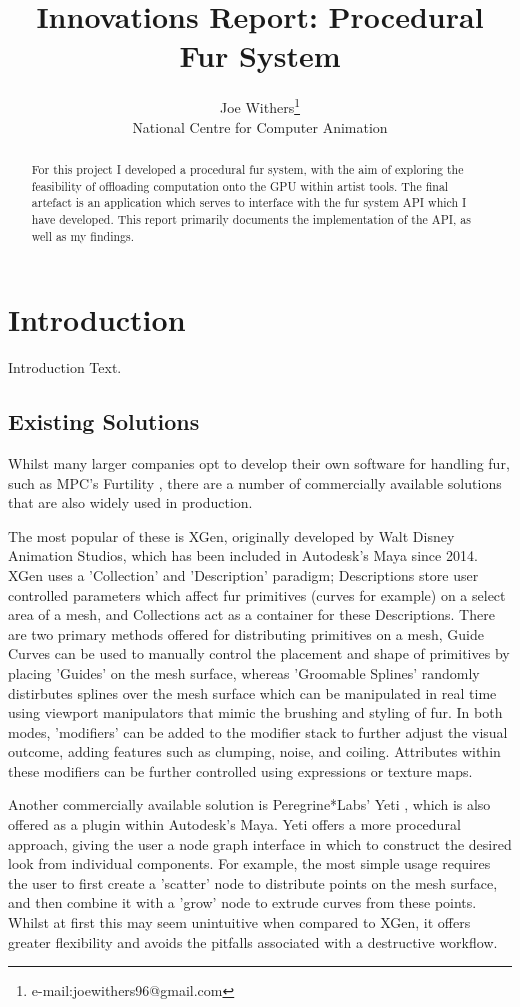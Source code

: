 \documentclass[]{acmsiggraph}
\title{Innovations Report: Procedural Fur System}
\author{Joe Withers\thanks{e-mail:joewithers96@gmail.com}\\National Centre for Computer Animation}
\begin{document}
\maketitle

\begin{abstract}
For this project I developed a procedural fur system, with the aim of exploring the feasibility of offloading computation onto the GPU within artist tools. The final artefact is an application which serves to interface with the fur system API which I have developed. This report primarily documents the implementation of the API, as well as my findings.
\end{abstract}

\section{Introduction} \label{sec:introduction}
Introduction Text.

\subsection{Existing Solutions} \label{sec:existing}
Whilst many larger companies opt to develop their own software for handling fur, such as MPC's Furtility \cite{furtility}, there are a number of commercially available solutions that are also widely used in production.

The most popular of these is XGen, originally developed by Walt Disney Animation Studios, which has been included in Autodesk's Maya since 2014. XGen uses a 'Collection' and 'Description' paradigm; Descriptions store user controlled parameters which affect fur primitives (curves for example) on a select area of a mesh, and Collections act as a container for these Descriptions. There are two primary methods offered for distributing primitives on a mesh, Guide Curves can be used to manually control the placement and shape of primitives by placing 'Guides' on the mesh surface, whereas 'Groomable Splines' randomly distirbutes splines over the mesh surface which can be manipulated in real time using viewport manipulators that mimic the brushing and styling of fur. In both modes, 'modifiers' can be added to the modifier stack to further adjust the visual outcome, adding features such as clumping, noise, and coiling. Attributes within these modifiers can be further controlled using expressions or texture maps.

Another commercially available solution is Peregrine*Labs' Yeti \cite{yeti}, which is also offered as a plugin within Autodesk's Maya. Yeti offers a more procedural approach, giving the user a node graph interface in which to construct the desired look from individual components. For example, the most simple usage requires the user to first create a 'scatter' node to distribute points on the mesh surface, and then combine it with a 'grow' node to extrude curves from these points. Whilst at first this may seem unintuitive when compared to XGen, it offers greater flexibility and avoids the pitfalls associated with a destructive workflow.
\end{document}
